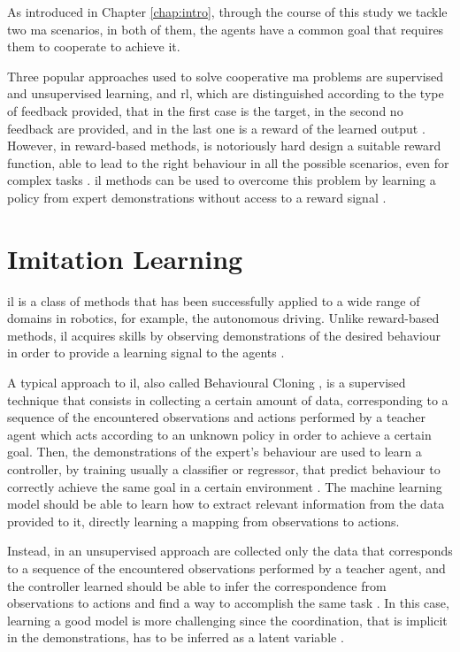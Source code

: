 As introduced in Chapter \ref{chap:intro}, through the course of this study we 
tackle two \gls{ma} scenarios, in both of them, the agents have a common goal 
that requires them to cooperate to achieve it. 

Three popular approaches used to solve cooperative \gls{ma} problems are 
supervised and unsupervised learning, and \gls{rl}, which are distinguished 
according to the type of feedback provided, that in the first case is the target, in 
the second no feedback are provided, and in the last one is a reward of the 
learned output \cite[][]{panait2005cooperative}.
However, in reward-based methods, is notoriously hard design a suitable reward 
function, able to lead to the right behaviour in all the possible scenarios, even for 
complex tasks \cite[][]{hadfield2017inverse}.
\gls{il} methods can be used to overcome this problem by learning a policy from 
expert demonstrations without access to a reward signal \cite[][]{song2018multi}.

\section{Imitation Learning}
\label{sec:imitlrng}

\gls{il} is a class of methods that has been successfully applied to a 
wide range of domains in robotics, for example, the autonomous driving.
Unlike reward-based methods, \gls{il} acquires skills by observing demonstrations 
of the desired behaviour in order to provide a learning signal to the agents 
\cite[][]{zhang2018deep}.

A typical approach to \gls{il}, also called Behavioural Cloning 
\cite[][]{torabi2018behavioral}, is a supervised technique that consists in 
collecting a certain amount of data, corresponding to a sequence of the 
encountered observations and actions performed by a teacher agent which acts 
according to an unknown policy in order to achieve a certain goal.
Then, the demonstrations of the expert’s behaviour are used to learn a controller, 
by training usually a classifier or regressor, that predict behaviour to correctly 
achieve the same goal in a certain environment \cite[][]{stadie2017third, 
ross2011reduction}.
The machine learning model should be able to learn how to extract relevant 
information from the data provided to it, directly learning a mapping from 
observations to actions.

Instead, in an unsupervised approach are collected only the data that corresponds 
to a sequence of the encountered observations performed by a teacher agent, 
and the controller learned should be able to infer the correspondence from 
observations to actions and find a way to accomplish the same task 
\cite[][]{stadie2017third}.
In this case, learning a good model is more challenging since the coordination, 
that is implicit in the demonstrations, has to be inferred as a latent variable 
\cite[][]{le2017coordinated}.

